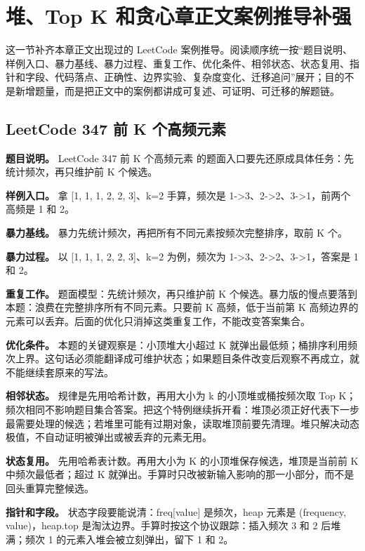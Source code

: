 \section{堆、Top K 和贪心章正文案例推导补强}

这一节补齐本章正文出现过的 LeetCode 案例推导。阅读顺序统一按“题目说明、样例入口、暴力基线、暴力过程、重复工作、优化条件、相邻状态、状态复用、指针和字段、代码落点、正确性、边界实验、复杂度变化、迁移追问”展开；目的不是新增题量，而是把正文中的案例都讲成可复述、可证明、可迁移的解题链。

\subsection{LeetCode 347 前 K 个高频元素}

\textbf{题目说明。} LeetCode 347 前 K 个高频元素 的题面入口要先还原成具体任务：先统计频次，再只维护前 K 个候选。

\textbf{样例入口。} 拿 [1, 1, 1, 2, 2, 3]、k=2 手算，频次是 1->3、2->2、3->1，前两个高频是 1 和 2。

\textbf{暴力基线。} 暴力先统计频次，再把所有不同元素按频次完整排序，取前 K 个。

\textbf{暴力过程。} 以 [1, 1, 1, 2, 2, 3]、k=2 为例，频次为 1->3、2->2、3->1，答案是 1 和 2。

\textbf{重复工作。} 题面模型：先统计频次，再只维护前 K 个候选。暴力版的慢点要落到本题：浪费在完整排序所有不同元素。只要前 K 高频，低于当前第 K 高频边界的元素可以丢弃。后面的优化只消掉这类重复工作，不能改变答案集合。

\textbf{优化条件。} 本题的关键观察是：小顶堆大小超过 K 就弹出最低频；桶排序利用频次上界。这句话必须能翻译成可维护状态；如果题目条件改变后观察不再成立，就不能继续套原来的写法。

\textbf{相邻状态。} 规律是先用哈希计数，再用大小为 k 的小顶堆或桶按频次取 Top K；频次相同不影响题目集合答案。把这个特例继续拆开看：堆顶必须正好代表下一步最需要处理的候选；若堆里可能有过期对象，读取堆顶前要先清理。堆只解决动态极值，不自动证明被弹出或被丢弃的元素无用。

\textbf{状态复用。} 先用哈希表计数。再用大小为 K 的小顶堆保存候选，堆顶是当前前 K 中频次最低者；超过 K 就弹出。手算时只改被新输入影响的那一小部分，而不是回头重算完整候选。

\textbf{指针和字段。} 状态字段要能说清：freq[value] 是频次，heap 元素是 (frequency, value)，heap.top 是淘汰边界。手算时按这个协议跟踪：插入频次 3 和 2 后堆满；频次 1 的元素入堆会被立刻弹出，留下 1 和 2。

